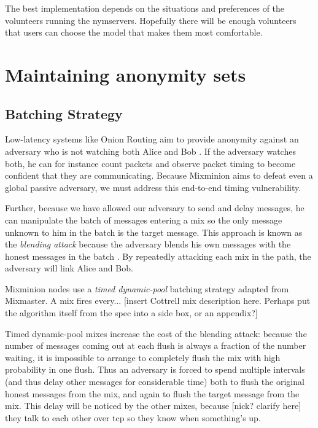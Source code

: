 \documentclass[11pt]{IEEEtran}
\begin{document}
The best implementation depends on the situations and preferences of
the volunteers running the nymservers. Hopefully there will be enough
volunteers that users can choose the model that makes them most
comfortable.


\section{Maintaining anonymity sets}
\label{sec:maintaining-anonymity}

\subsection{Batching Strategy}
\label{subsec:batching}

Low-latency systems like Onion Routing aim to provide anonymity against an
adversary who is not watching both Alice and Bob \cite{onion-routing}. If
the adversary watches both, he can for instance count packets and observe
packet timing to become confident that they are communicating. Because
Mixminion aims to defeat even a global passive adversary, we must address
this end-to-end timing vulnerability.

Further, because we have allowed our adversary to send and delay messages,
he can manipulate the batch of messages entering a mix so the only message
unknown to him in the batch is the target message. This approach is
known as the \emph{blending attack} because the adversary blends his
own messages with the honest messages in the batch
\cite{batching-taxonomy}. By repeatedly
attacking each mix in the path, the adversary will link Alice and Bob.

Mixminion nodes use a \emph{timed dynamic-pool} batching strategy
\cite{batching-taxonomy} adapted from Mixmaster. A
mix fires every... [insert Cottrell mix description here. Perhaps put
the algorithm itself from the spec into a side box, or an appendix?]

Timed dynamic-pool mixes increase
the cost of the blending attack: because the number of messages coming
out at each flush is always a fraction of the number waiting, it is
impossible to arrange to completely flush the mix with high probability
in one flush. Thus an adversary is forced to spend multiple intervals
(and thus delay other messages for considerable time) both to flush
the original honest messages from the mix, and again to flush the
target message from the mix. This delay will be noticed by the other
mixes, because [nick? clarify here] they talk to each other over tcp so
they know when something's up.
\end{document}
